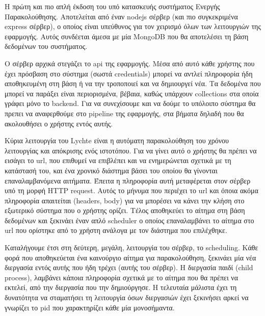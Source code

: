Η πρώτη και πιο απλή έκδοση του υπό κατασκευής συστήματος Ενεργής Παρακολούθησης. Αποτελείται από έναν
nodejs σέρβερ (και πιο συγκεκριμένα express σέρβερ), ο οποίος είναι υπεύθυνος για τον χειρισμό όλων των λειτουργιών της εφαρμογής. Αυτός συνδέεται
άμεσα με μία MongoDB που θα αποτελέσει τη βάση δεδομένων του συστήματος.

Ο σέρβερ αρχικά στεγάζει το api της εφαρμογής. Μέσα από αυτό κάθε χρήστης που έχει πρόσβαση στο σύστημα (σωστά credentials)
μπορεί να αντλεί πληροφορία ήδη αποθηκευμένη στη βάση ή να την τροποποιεί και να δημιουργεί νέα. Τα δεδομένα που μπορεί να παράξει
είναι περιορισμένα, βέβαια, καθώς υπάρχουν collections στα οποία γράφει μόνο το backend. Για να συνεχίσουμε και να δούμε το υπόλοιπο σύστημα
θα πρεπει να αναφερθούμε στο pipeline της εφαρμογής, στα βήματα δηλαδή που θα ακολουθήσει ο χρήστης εντός αυτής.

Κύρια λειτουργία του Lychte είναι η αυτόματη παρακολούθηση του χρόνου λειτουργίας και απόκρισης ενός ιστοτόπου.
Για να γίνει αυτό ο χρήστης θα πρέπει να εισάγει το url, που επιθυμεί να επιβλέπει και να ενημερώνεται σχετικά με
τη κατάστασή του, και ένα χρονικό διάστημα βάσει του οποίου θα γίνονται επαναλαμβανόμενα αιτήματα.
Έπειτα η πληροφορία αυτή μεταφέρεται στον σέρβερ υπό τη μορφή HTTP request. Αυτός το μήνυμα που περιέχει το url και
όποια ακόμα πληροφορία απαιτείται (headers, body) για να μπορέσει να κάνει την κλήση στο εξωτερικό σύστημα
που ο χρήστης ορίζει. Τέλος αποθηκεύει το αίτημα στη βάση δεδομένων και ξεκινάει έναν απλό scheduler
ο οποίος επαναλαμβάνει το αίτημα στο url που ορίστηκε από το χρήστη ανάλογα με τον διάστημα
που επιλέχθηκε.

Καταλήγουμε έτσι στη δεύτερη, μεγάλη, λειτουργία του σέρβερ, το scheduling. Κάθε φορά που αποθηκεύεται ένα καινούργιο
αίτημα για παρακολούθηση, ξεκινάει μία νέα διεργασία εντός αυτής που ήδη τρέχει (αυτής του σέρβερ). Η διεργασία παιδί (child process),
λαμβάνει κάποια πληροφορία σχετικά με το αίτημα που θα πρέπει να εκτελεί, από την διεργασία που την δημιούργησε. Η τελευταία μάλιστα
έχει τη δυνατότητα να σταματήσει τη λειτουργία όσων διεργασιών έχει ξεκινήσει αρκεί να γνωρίζει το pid που χαρακτηρίζει κάθε μία μονοσήμαντα.

